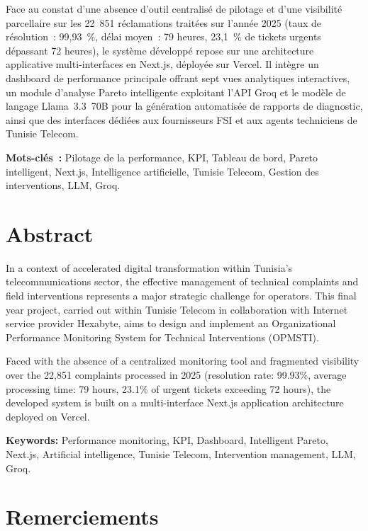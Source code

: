 \documentclass[11pt,a4paper]{report}
\begin{document}
Face au constat d'une absence d'outil centralisé de pilotage et d'une visibilité parcellaire sur les 22~851 réclamations traitées sur l'année 2025 (taux de résolution~: 99,93~\%, délai moyen~: 79 heures, 23,1~\% de tickets urgents dépassant 72 heures), le système développé repose sur une architecture applicative multi-interfaces en Next.js, déployée sur Vercel. Il intègre un dashboard de performance principale offrant sept vues analytiques interactives, un module d'analyse Pareto intelligente exploitant l'API Groq et le modèle de langage Llama~3.3~70B pour la génération automatisée de rapports de diagnostic, ainsi que des interfaces dédiées aux fournisseurs FSI et aux agents techniciens de Tunisie Telecom.

\medskip
\noindent\textbf{Mots-clés~:} Pilotage de la performance, KPI, Tableau de bord, Pareto intelligent, Next.js, Intelligence artificielle, Tunisie Telecom, Gestion des interventions, LLM, Groq.

\chapter*{Abstract}

In a context of accelerated digital transformation within Tunisia's telecommunications sector, the effective management of technical complaints and field interventions represents a major strategic challenge for operators. This final year project, carried out within Tunisie Telecom in collaboration with Internet service provider Hexabyte, aims to design and implement an Organizational Performance Monitoring System for Technical Interventions (OPMSTI).

Faced with the absence of a centralized monitoring tool and fragmented visibility over the 22,851 complaints processed in 2025 (resolution rate: 99.93\%, average processing time: 79 hours, 23.1\% of urgent tickets exceeding 72 hours), the developed system is built on a multi-interface Next.js application architecture deployed on Vercel.

\medskip
\noindent\textbf{Keywords:} Performance monitoring, KPI, Dashboard, Intelligent Pareto, Next.js, Artificial intelligence, Tunisie Telecom, Intervention management, LLM, Groq.

\chapter*{Remerciements}
\end{document}
